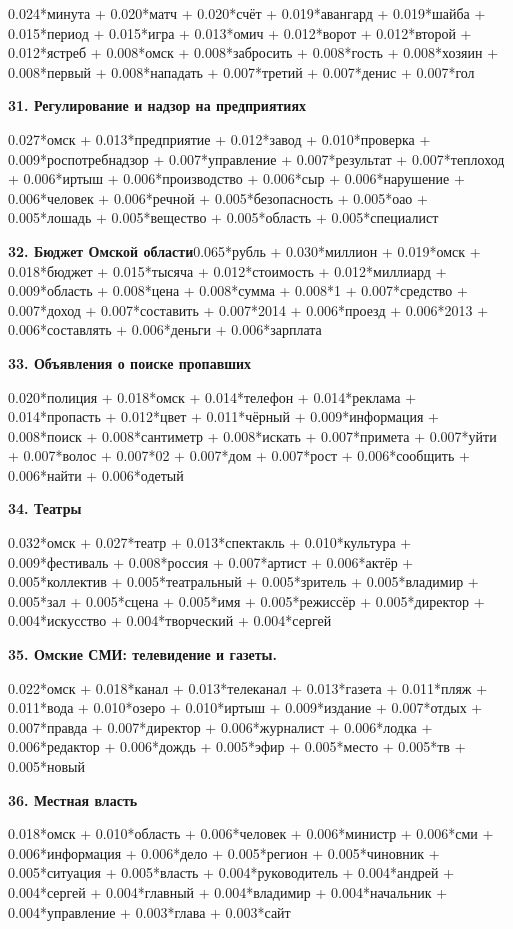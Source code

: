 0.024*минута + 0.020*матч + 0.020*счёт + 0.019*авангард + 0.019*шайба + 0.015*период + 0.015*игра + 0.013*омич + 0.012*ворот + 0.012*второй + 0.012*ястреб + 0.008*омск + 0.008*забросить + 0.008*гость + 0.008*хозяин + 0.008*первый + 0.008*нападать + 0.007*третий + 0.007*денис + 0.007*гол

\textbf{31. Регулирование и надзор на предприятиях}

0.027*омск + 0.013*предприятие + 0.012*завод + 0.010*проверка + 0.009*роспотребнадзор + 0.007*управление + 0.007*результат + 0.007*теплоход + 0.006*иртыш + 0.006*производство + 0.006*сыр + 0.006*нарушение + 0.006*человек + 0.006*речной + 0.005*безопасность + 0.005*оао + 0.005*лошадь + 0.005*вещество + 0.005*область + 0.005*специалист

\textbf{32. Бюджет Омской области}0.065*рубль + 0.030*миллион + 0.019*омск + 0.018*бюджет + 0.015*тысяча + 0.012*стоимость + 0.012*миллиард + 0.009*область + 0.008*цена + 0.008*сумма + 0.008*1 + 0.007*средство + 0.007*доход + 0.007*составить + 0.007*2014 + 0.006*проезд + 0.006*2013 + 0.006*составлять + 0.006*деньги + 0.006*зарплата

\textbf{33. Объявления о поиске пропавших}

0.020*полиция + 0.018*омск + 0.014*телефон + 0.014*реклама + 0.014*пропасть + 0.012*цвет + 0.011*чёрный + 0.009*информация + 0.008*поиск + 0.008*сантиметр + 0.008*искать + 0.007*примета + 0.007*уйти + 0.007*волос + 0.007*02 + 0.007*дом + 0.007*рост + 0.006*сообщить + 0.006*найти + 0.006*одетый

\textbf{34. Театры}

0.032*омск + 0.027*театр + 0.013*спектакль + 0.010*культура + 0.009*фестиваль + 0.008*россия + 0.007*артист + 0.006*актёр + 0.005*коллектив + 0.005*театральный + 0.005*зритель + 0.005*владимир + 0.005*зал + 0.005*сцена + 0.005*имя + 0.005*режиссёр + 0.005*директор + 0.004*искусство + 0.004*творческий + 0.004*сергей

\textbf{35. Омские СМИ: телевидение и газеты.}

0.022*омск + 0.018*канал + 0.013*телеканал + 0.013*газета + 0.011*пляж + 0.011*вода + 0.010*озеро + 0.010*иртыш + 0.009*издание + 0.007*отдых + 0.007*правда + 0.007*директор + 0.006*журналист + 0.006*лодка + 0.006*редактор + 0.006*дождь + 0.005*эфир + 0.005*место + 0.005*тв + 0.005*новый

\textbf{36. Местная власть}

0.018*омск + 0.010*область + 0.006*человек + 0.006*министр + 0.006*сми + 0.006*информация + 0.006*дело + 0.005*регион + 0.005*чиновник + 0.005*ситуация + 0.005*власть + 0.004*руководитель + 0.004*андрей + 0.004*сергей + 0.004*главный + 0.004*владимир + 0.004*начальник + 0.004*управление + 0.003*глава + 0.003*сайт

